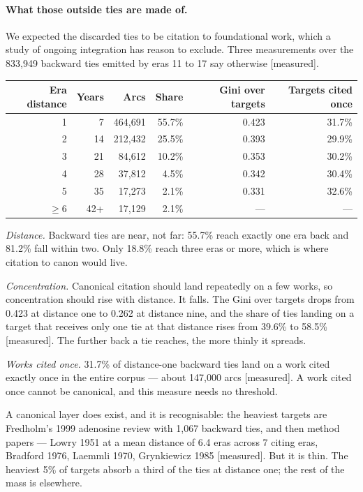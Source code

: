 \documentclass[11pt]{article}
\newcommand{\meas}{{\footnotesize\textsf{[measured]}}}
\begin{document}
\paragraph{What those outside ties are made of.} We expected the discarded ties to be
citation to foundational work, which a study of ongoing integration has reason to exclude.
Three measurements over the 833{,}949 backward ties emitted by eras 11 to 17 say otherwise
\meas{}.

\begin{center}
\small
\begin{tabular}{rrrrrr}
\toprule
Era distance & Years & Arcs & Share & Gini over targets & Targets cited once \\
\midrule
1 & 7 & 464{,}691 & 55.7\% & 0.423 & 31.7\% \\
2 & 14 & 212{,}432 & 25.5\% & 0.393 & 29.9\% \\
3 & 21 & 84{,}612 & 10.2\% & 0.353 & 30.2\% \\
4 & 28 & 37{,}812 & 4.5\% & 0.342 & 30.4\% \\
5 & 35 & 17{,}273 & 2.1\% & 0.331 & 32.6\% \\
$\geq$6 & 42+ & 17{,}129 & 2.1\% & --- & --- \\
\bottomrule
\end{tabular}
\end{center}

\noindent \emph{Distance.} Backward ties are near, not far: 55.7\% reach exactly one era
back and 81.2\% fall within two. Only 18.8\% reach three eras or more, which is where
citation to canon would live.

\emph{Concentration.} Canonical citation should land repeatedly on a few works, so
concentration should rise with distance. It falls. The Gini over targets drops from 0.423 at
distance one to 0.262 at distance nine, and the share of ties landing on a target that
receives only one tie at that distance rises from 39.6\% to 58.5\% \meas{}. The further back
a tie reaches, the more thinly it spreads.

\emph{Works cited once.} 31.7\% of distance-one backward ties land on a work cited exactly
once in the entire corpus --- about 147{,}000 arcs \meas{}. A work cited once cannot be
canonical, and this measure needs no threshold.

A canonical layer does exist, and it is recognisable: the heaviest targets are Fredholm's
1999 adenosine review with 1{,}067 backward ties, and then method papers --- Lowry 1951 at a
mean distance of 6.4 eras across 7 citing eras, Bradford 1976, Laemmli 1970, Grynkiewicz
1985 \meas{}. But it is thin. The heaviest 5\% of targets absorb a third of the ties at
distance one; the rest of the mass is elsewhere.
\end{document}
